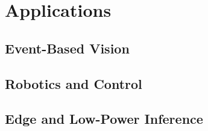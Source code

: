 \section{Applications}
\label{sec:applications}


\subsection{Event-Based Vision}

\subsection{Robotics and Control}

\subsection{Edge and Low-Power Inference}
